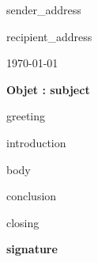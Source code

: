 \documentclass[11pt,a4paper]{letter}
\begin{document}
\begin{letter}{}

\noindent
{{sender_address}}

\begin{flushright}
{{recipient_address}}
\end{flushright}

\begin{flushright}
\today
\end{flushright}

\noindent\textbf{Objet : {{subject}} }

{{greeting}}

{{introduction}}

{{body}}

{{conclusion}}

{{closing}}

\textbf{ {{signature}} }

\end{letter}
\end{document}
